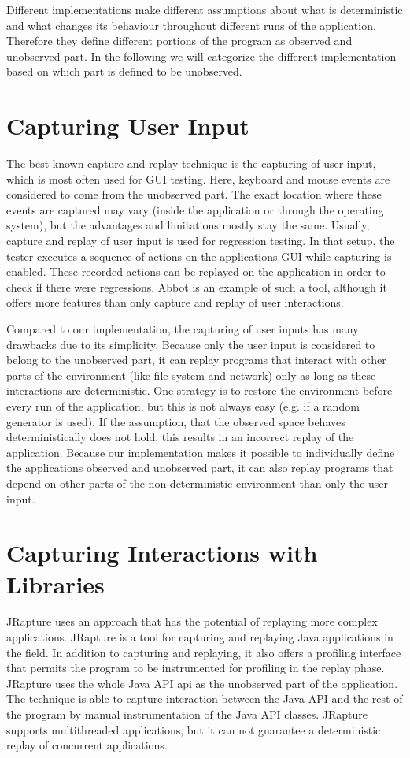 Different implementations make different assumptions about what is deterministic and what changes its behaviour throughout different runs of the application. Therefore they define different portions of the program as observed and unobserved part. In the following we will categorize the different implementation based on which part is defined to be unobserved.

\section {Capturing User Input}
The best known capture and replay technique is the capturing of user input, which is most often used for GUI testing. Here, keyboard and mouse events are considered to come from the unobserved part. The exact location where these events are captured may vary (inside the application or through the operating system), but the advantages and limitations mostly stay the same. Usually, capture and replay of user input is used for regression testing. In that setup, the tester executes a sequence of actions on the applications GUI while capturing is enabled. These recorded actions can be replayed on the application in order to check if there were regressions. Abbot \cite{abbot} is an example of such a tool, although it offers more features than only capture and replay of user interactions. %

Compared to our implementation, the capturing of user inputs has many drawbacks due to its simplicity. Because only the user input is considered to belong to the unobserved part, it can replay programs that interact with other parts of the environment (like file system and network) only as long as these interactions are deterministic. One strategy is to restore the environment before every run of the application, but this is not always easy (e.g. if a random generator is used). If the assumption, that the observed space behaves deterministically does not hold, this results in an incorrect replay of the application. Because our implementation makes it possible to individually define the applications observed and unobserved part, it can also replay programs that depend on other parts of the non-deterministic environment than only the user input.

\section {Capturing Interactions with Libraries}
JRapture \cite{jrapture} uses an approach that has the potential of replaying more complex applications. JRapture is a tool for capturing and replaying Java applications in the field. In addition to capturing and replaying, it also offers a profiling interface that permits the program to be instrumented for profiling in the replay phase. JRapture uses the whole Java API api as the unobserved part of the application. The technique is able to capture interaction between the Java API and the rest of the program by manual instrumentation of the Java API classes. JRapture supports multithreaded applications, but it can not guarantee a deterministic replay of concurrent applications.

